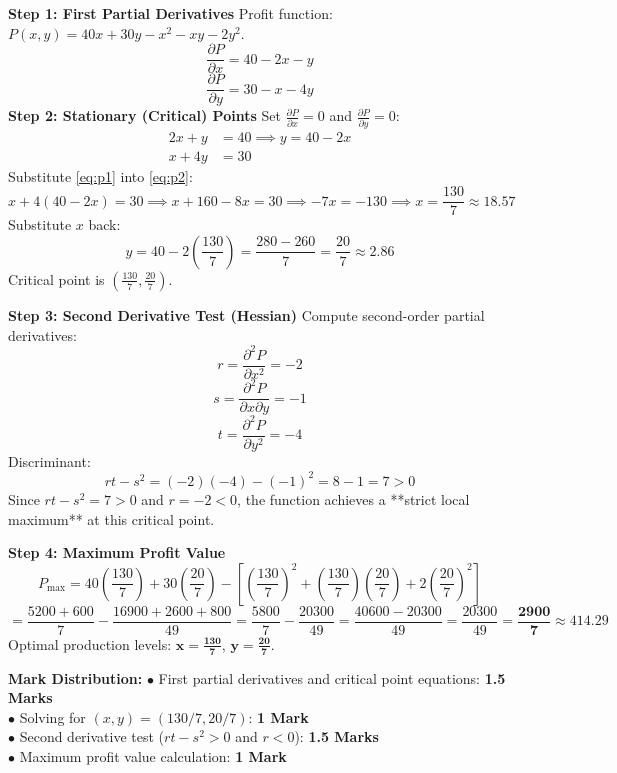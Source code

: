 \begin{solutionbox}
\textbf{Step 1: First Partial Derivatives}
Profit function: $P(x,y) = 40x + 30y - x^2 - xy - 2y^2$.
\[
\frac{\partial P}{\partial x} = 40 - 2x - y
\]
\[
\frac{\partial P}{\partial y} = 30 - x - 4y
\]
\textbf{Step 2: Stationary (Critical) Points}
Set $\frac{\partial P}{\partial x} = 0$ and $\frac{\partial P}{\partial y} = 0$:
\begin{align}
2x + y &= 40 \implies y = 40 - 2x \label{eq:p1} \\
x + 4y &= 30 \label{eq:p2}
\end{align}
Substitute \eqref{eq:p1} into \eqref{eq:p2}:
\[
x + 4(40 - 2x) = 30 \implies x + 160 - 8x = 30 \implies -7x = -130 \implies x = \frac{130}{7} \approx 18.57
\]
Substitute $x$ back:
\[
y = 40 - 2\left(\frac{130}{7}\right) = \frac{280 - 260}{7} = \frac{20}{7} \approx 2.86
\]
Critical point is $\left(\frac{130}{7}, \frac{20}{7}\right)$.

\textbf{Step 3: Second Derivative Test (Hessian)}
Compute second-order partial derivatives:
\[
r = \frac{\partial^2 P}{\partial x^2} = -2
\]
\[
s = \frac{\partial^2 P}{\partial x \partial y} = -1
\]
\[
t = \frac{\partial^2 P}{\partial y^2} = -4
\]
Discriminant:
\[
rt - s^2 = (-2)(-4) - (-1)^2 = 8 - 1 = 7 > 0
\]
Since $rt - s^2 = 7 > 0$ and $r = -2 < 0$, the function achieves a **strict local maximum** at this critical point.

\textbf{Step 4: Maximum Profit Value}
\[
P_{\max} = 40\left(\frac{130}{7}\right) + 30\left(\frac{20}{7}\right) - \left[\left(\frac{130}{7}\right)^2 + \left(\frac{130}{7}\right)\left(\frac{20}{7}\right) + 2\left(\frac{20}{7}\right)^2\right]
\]
\[
= \frac{5200 + 600}{7} - \frac{16900 + 2600 + 800}{49} = \frac{5800}{7} - \frac{20300}{49} = \frac{40600 - 20300}{49} = \frac{20300}{49} = \mathbf{\frac{2900}{7} \approx 414.29}
\]
Optimal production levels: $\mathbf{x = \frac{130}{7}}$, $\mathbf{y = \frac{20}{7}}$.

\begin{markingrubric}
\textbf{Mark Distribution:}
$\bullet$ First partial derivatives and critical point equations: \textbf{1.5 Marks}\\
$\bullet$ Solving for $(x,y) = (130/7, 20/7)$: \textbf{1 Mark}\\
$\bullet$ Second derivative test ($rt - s^2 > 0$ and $r < 0$): \textbf{1.5 Marks}\\
$\bullet$ Maximum profit value calculation: \textbf{1 Mark}
\end{markingrubric}
\end{solutionbox}

